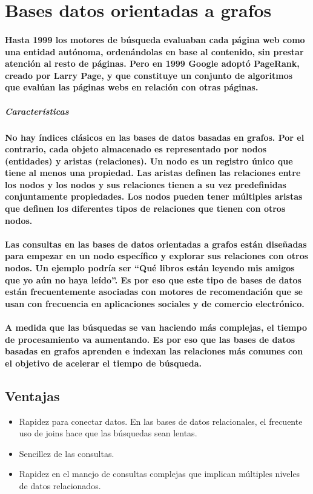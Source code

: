 \section{Bases datos orientadas a grafos}
 \paragraph{Hasta 1999 los motores de búsqueda evaluaban cada página web como una entidad autónoma, ordenándolas en base al contenido, sin prestar atención al resto de páginas. Pero en 1999 Google adoptó PageRank, creado por Larry Page, y que constituye un conjunto de algoritmos que evalúan las páginas webs en relación con otras páginas.}

\subparagraph{Características}
\paragraph{No hay índices clásicos en las bases de datos basadas en grafos. Por el contrario, cada objeto almacenado es representado por nodos (entidades) y aristas (relaciones). Un nodo es un registro único que tiene al menos una propiedad. Las aristas definen las relaciones entre los nodos y los nodos y sus relaciones tienen a su vez predefinidas conjuntamente propiedades. Los nodos pueden tener múltiples aristas que definen los diferentes tipos de relaciones que tienen con otros nodos.}

\paragraph{Las consultas en las bases de datos orientadas a grafos están diseñadas para empezar en un nodo específico y explorar sus relaciones con otros nodos. Un ejemplo podría ser “Qué libros están leyendo mis amigos que yo aún no haya leído”. Es por eso que este tipo de bases de datos están frecuentemente asociadas con motores de recomendación que se usan con frecuencia en aplicaciones sociales y de comercio electrónico.}

\paragraph{A medida que las búsquedas se van haciendo más complejas, el tiempo de procesamiento va aumentando. Es por eso que las bases de datos basadas en grafos aprenden e indexan las relaciones más comunes con el objetivo de acelerar el tiempo de búsqueda.}
\subsection{Ventajas}
\begin{itemize}
  \item Rapidez para conectar datos. En las bases de datos relacionales, el frecuente uso de joins hace que las búsquedas sean lentas.
  \item Sencillez de las consultas.
  \item Rapidez en el manejo de consultas complejas que implican múltiples niveles de datos relacionados.
\end{itemize}   
